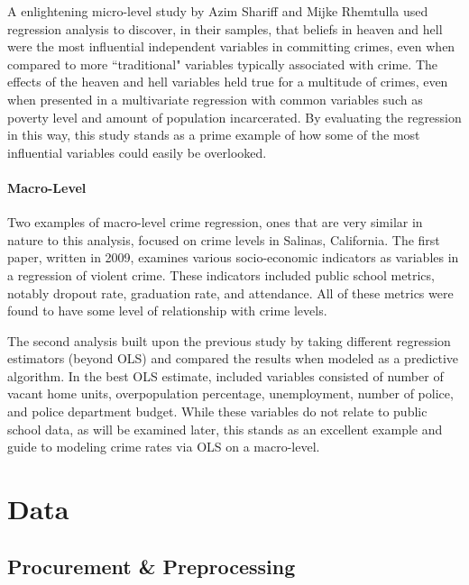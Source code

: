 \documentclass[12pt]{article}
\begin{document}
\par

A enlightening micro-level study by Azim Shariff and Mijke Rhemtulla used regression analysis to discover, in their samples, that beliefs in heaven and hell were the most influential independent variables in committing crimes, even when compared to more ``traditional" variables typically associated with crime.\cite{shariff}  The effects of the heaven and hell variables held true for a multitude of crimes, even when presented in a multivariate regression with common variables such as poverty level and amount of population incarcerated.  By evaluating the regression in this way, this study stands as a prime example of how some of the most influential variables could easily be overlooked.

\paragraph{Macro-Level}

Two examples of macro-level crime regression, ones that are very similar in nature to this analysis, focused on crime levels in Salinas, California.  The first paper, written in 2009, examines various socio-economic indicators as variables in a regression of violent crime.  These indicators included public school metrics, notably dropout rate, graduation rate, and attendance.  All of these metrics were found to have some level of relationship with crime levels.\cite{salinas_env}

\par

The second analysis built upon the previous study by taking different regression estimators (beyond OLS) and compared the results when modeled as a predictive algorithm.  In the best OLS estimate, included variables consisted of number of vacant home units, overpopulation percentage, unemployment, number of police, and police department budget.\cite{salinas_crime}  While these variables do not relate to public school data, as will be examined later, this stands as an excellent example and guide to modeling crime rates via OLS on a macro-level.

	\section{Data}


\subsection{Procurement \& Preprocessing}
\end{document}
